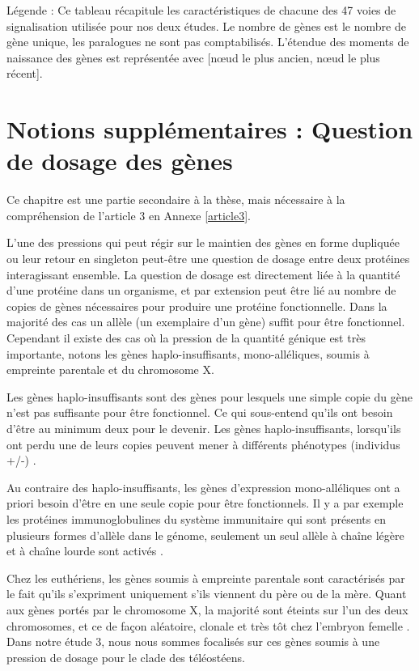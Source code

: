Légende : Ce tableau récapitule les caractéristiques de chacune des 47 voies de signalisation utilisée pour nos deux études. Le nombre de gènes est le nombre de gène unique, les paralogues ne sont pas comptabilisés. L’étendue des moments de naissance des gènes est représentée avec [nœud le plus ancien, nœud le plus récent].

\newpage
\section{Notions supplémentaires : Question de dosage des gènes}
\par Ce chapitre est une partie secondaire à la thèse, mais nécessaire à la compréhension de l’article 3 en Annexe \ref{article3}. 
\par L’une des pressions qui peut régir sur le maintien des gènes en forme dupliquée ou leur retour en singleton peut-être une question de dosage entre deux protéines interagissant ensemble. La question de dosage est directement liée à la quantité d’une protéine dans un organisme, et par extension peut être lié au nombre de copies de gènes nécessaires pour produire une protéine fonctionnelle. Dans la majorité des cas un allèle (un exemplaire d’un gène) suffit pour être fonctionnel. Cependant il existe des cas où la pression de la quantité génique est très importante, notons les gènes haplo-insuffisants, mono-alléliques, soumis à empreinte parentale et du chromosome X. 
\par Les gènes haplo-insuffisants sont des gènes pour lesquels une simple copie du gène n’est pas suffisante pour être fonctionnel. Ce qui sous-entend qu’ils ont besoin d’être au minimum deux pour le devenir. Les gènes haplo-insuffisants, lorsqu’ils ont perdu une de leurs copies peuvent mener à différents phénotypes (individus +/-) \parencite{johnson_causes_2019}. 
\par Au contraire des haplo-insuffisants, les gènes d’expression mono-alléliques ont a priori besoin d’être en une seule copie pour être fonctionnels. Il y a par exemple les protéines immunoglobulines du système immunitaire qui sont présents en plusieurs formes d’allèle dans le génome, seulement un seul allèle à chaîne légère et à chaîne lourde sont activés \parencite{vettermann_allelic_2010}. 
\par Chez les euthériens, les gènes soumis à empreinte parentale sont caractérisés par le fait qu’ils s’expriment uniquement s’ils viennent du père ou de la mère. Quant aux gènes portés par le chromosome X, la majorité sont éteints sur l’un des deux chromosomes, et ce de façon aléatoire, clonale et très tôt chez l’embryon femelle \parencite{balaton_exceptional_2018}. 
Dans notre étude 3, nous nous sommes focalisés sur ces gènes soumis à une pression de dosage pour le clade des téléostéens.


